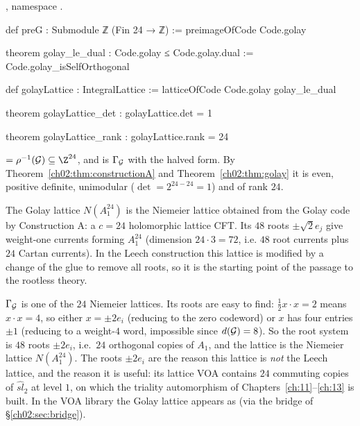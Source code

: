 \begin{definition}
, namespace .
\end{definition}
\begin{leancode}
def preG : Submodule ℤ (Fin 24 → ℤ) := preimageOfCode Code.golay

theorem golay_le_dual : Code.golay ≤ Code.golay.dual := Code.golay_isSelfOrthogonal

def golayLattice : IntegralLattice := latticeOfCode Code.golay golay_le_dual

theorem golayLattice_det : golayLattice.det = 1

theorem golayLattice_rank : golayLattice.rank = 24
\end{leancode}
\begin{dictionary}
 $=\rho^{-1}(\chtwoG)\subseteq\Z^{24}$, and  is
$\Gamma_{\mathcal{G}}$ with the halved form.  By Theorem~\ref{ch02:thm:constructionA} and
Theorem~\ref{ch02:thm:golay} it is even, positive definite, unimodular ($\det=2^{24-24}=1$) and of
rank $24$.
\end{dictionary}
\begin{physics}
The Golay lattice $N(A_1^{24})$ is the Niemeier lattice obtained from the Golay code by Construction A: a $c=24$ holomorphic lattice CFT. Its $48$ roots $\pm\sqrt2 e_j$ give weight-one currents forming $A_1^{24}$ (dimension $24\cdot3=72$, i.e. $48$ root currents plus $24$ Cartan currents). In the Leech construction this lattice is modified by a change of the glue to remove all roots, so it is the starting point of the passage to the rootless theory.
\end{physics}

$\Gamma_{\mathcal{G}}$ is one of the $24$ Niemeier lattices.  Its roots are easy to find: $\tfrac12
x\cdot x=2$ means $x\cdot x=4$, so either $x=\pm2e_i$ (reducing to the zero codeword) or $x$ has
four entries $\pm1$ (reducing to a weight-$4$ word, impossible since $d(\mathcal{G})=8$).  So the root
system is $48$ roots $\pm2e_i$, i.e.\ $24$ orthogonal copies of $A_1$, and the lattice is the
Niemeier lattice $N(A_1^{24})$.  The roots $\pm2e_i$ are the reason this lattice is
\emph{not} the Leech lattice, and the reason it is useful: its lattice VOA contains $24$ commuting
copies of $\widehat{sl}_2$ at level $1$, on which the triality automorphism of
Chapters~\ref{ch:11}--\ref{ch:13} is built.  In the VOA library the Golay lattice appears as
 (via the bridge of \S\ref{ch02:sec:bridge}).

